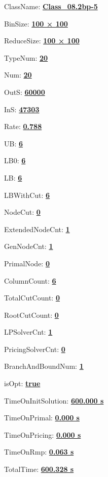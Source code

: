 \documentclass[11pt]{article}
\begin{document}
\pagestyle{empty}


ClassName: \underline{\textbf{Class_08.2bp-5}}
\par
BinSize: \underline{\textbf{100 × 100}}
\par
ReduceSize: \underline{\textbf{100 × 100}}
\par
TypeNum: \underline{\textbf{20}}
\par
Num: \underline{\textbf{20}}
\par
OutS: \underline{\textbf{60000}}
\par
InS: \underline{\textbf{47303}}
\par
Rate: \underline{\textbf{0.788}}
\par
UB: \underline{\textbf{6}}
\par
LB0: \underline{\textbf{6}}
\par
LB: \underline{\textbf{6}}
\par
LBWithCut: \underline{\textbf{6}}
\par
NodeCut: \underline{\textbf{0}}
\par
ExtendedNodeCnt: \underline{\textbf{1}}
\par
GenNodeCnt: \underline{\textbf{1}}
\par
PrimalNode: \underline{\textbf{0}}
\par
ColumnCount: \underline{\textbf{6}}
\par
TotalCutCount: \underline{\textbf{0}}
\par
RootCutCount: \underline{\textbf{0}}
\par
LPSolverCnt: \underline{\textbf{1}}
\par
PricingSolverCnt: \underline{\textbf{0}}
\par
BranchAndBoundNum: \underline{\textbf{1}}
\par
isOpt: \underline{\textbf{true}}
\par
TimeOnInitSolution: \underline{\textbf{600.000 s}}
\par
TimeOnPrimal: \underline{\textbf{0.000 s}}
\par
TimeOnPricing: \underline{\textbf{0.000 s}}
\par
TimeOnRmp: \underline{\textbf{0.063 s}}
\par
TotalTime: \underline{\textbf{600.328 s}}
\par
\newpage


\end{document}
